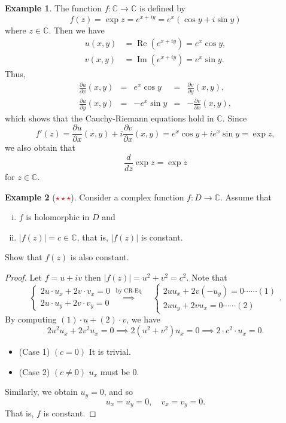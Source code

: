 \documentclass[12pt,openany]{book}
\theoremstyle{definition}
\newtheorem{example}{Example}[section]
\newcommand{\C}{\mathbb{C}}
\newcommand{\of}[1]{\left( #1 \right)}
\newcommand{\abs}[1]{\left\lvert #1 \right\rvert}
\renewcommand{\Re}{\operatorname{Re}}
\renewcommand{\Im}{\operatorname{Im}}
\begin{document}
	\begin{example}
		The function $f:\C\to\C$ is defined by \[
		f\of{z}=\exp z=e^{x+iy}=e^x\of{\cos y+i\sin y}
		\] where $z\in\C$. Then we have \begin{align*}
		u(x,y)&=\Re\of{e^{x+iy}}=e^x\cos y,\\
		v(x,y)&=\Im\of{e^{x+iy}}=e^x\sin y.
		\end{align*} Thus, \begin{align*}
		\frac{\partial u}{\partial x}\of{x,y} &=& e^x\cos y &=& \frac{\partial v}{\partial y}\of{x,y},\\
		\frac{\partial u}{\partial y}\of{x,y} &=& -e^x\sin y &=& -\frac{\partial v}{\partial x}\of{x,y},
		\end{align*} which shows that the Cauchy-Riemann equations hold in $\C$. Since \[
		f'\of{z}=\frac{\partial u}{\partial x}\of{x,y}+i\frac{\partial v}{\partial x}\of{x,y}=e^x\cos y+ie^x\sin y=\exp z,
		\] we also obtain that \[
		\frac{d}{dz}\exp z=\exp z
		\] for $z\in\C$.
	\end{example}
	
	\begin{example}[\textcolor{red}{$\star\star\star$}]
		Consider a complex function $f:D\to\C$. Assume that \begin{enumerate}[(i)]
			\item $f$ is holomorphic in $D$ and
			\item $\abs{f(z)}=c\in\C$, that is, $\abs{f(z)}$ is constant.
		\end{enumerate} Show that $f(z)$ is also constant.
		\begin{proof}
			Let $f=u+iv$ then $\abs{f(z)}=u^2+v^2=c^2$. Note that \[
			\begin{cases}
			2u\cdot u_x+2v\cdot v_x=0\\
			2u\cdot u_y+2v\cdot v_y=0
			\end{cases}\overset{\text{by CR-Eq}}{\implies}\quad\begin{cases}
			2uu_x+2v(-u_y)=0 \cdots\cdots(1)\\
			2uu_y+2vu_x=0 \cdots\cdots(2)
			\end{cases}.
			\] By computing $(1)\cdot u+(2)\cdot v$, we have \[
			2u^2u_x+2v^2u_x=0\implies 2(u^2+v^2)u_x=0\implies 2\cdot c^2\cdot u_x=0.
			\]
			\begin{itemize}
				\item[] (Case 1) $(c=0)$ It is trivial.
				\item[] (Case 2) $(c\neq 0)$ $u_x$ must be $0$.
			\end{itemize} Similarly, we obtain $u_y=0$, and so \[
			u_x=u_y=0,\quad v_x=v_y=0.
			\] That is, $f$ is constant.
		\end{proof}
	\end{example}
	
\end{document}
